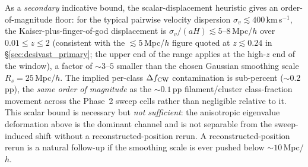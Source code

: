 \documentclass[aps,prd,twocolumn,superscriptaddress,showpacs,preprintnumbers,nofootinbib,longbibliography,floatfix]{revtex4-2}
\begin{document}
\begin{itemize}
As a \emph{secondary} indicative bound, the scalar-displacement
heuristic gives an order-of-magnitude floor: for the typical
pairwise velocity dispersion $\sigma_v \lesssim 400$\,km\,s$^{-1}$,
the Kaiser-plus-finger-of-god displacement is
$\sigma_v/(aH) \lesssim 5$--$8$\,Mpc/$h$ over $0.01 \le z \le 2$
(consistent with the $\lesssim 5$\,Mpc/$h$ figure quoted at
$z \lesssim 0.24$ in \S\ref{sec:desivast_primary}; the upper end of
the range applies at the high-$z$ end of the window),
a factor of $\sim 3$--$5$ smaller than the chosen Gaussian smoothing
scale $R_s = 25$\,Mpc/$h$. The implied per-class $\Delta f_{\rm CW}$
contamination is sub-percent ($\sim 0.2$\,pp), the
\emph{same order of magnitude} as the ${\sim}0.1$\,pp
filament/cluster class-fraction movement across the Phase~2 sweep
cells rather than negligible relative to it. This scalar bound is
necessary but \emph{not sufficient}: the anisotropic eigenvalue
deformation above is the dominant channel and is not separable from
the sweep-induced shift without a reconstructed-position rerun.
A reconstructed-position rerun is a natural follow-up if the smoothing
scale is ever pushed below $\sim 10$\,Mpc/$h$.


\end{itemize}
\end{document}
